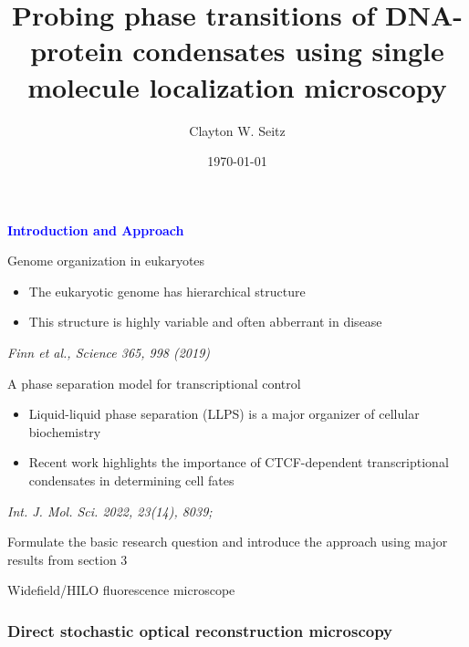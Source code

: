 \documentclass{beamer}					%
\title{Probing phase transitions of DNA-protein condensates using single molecule localization microscopy}	%
\author{Clayton W. Seitz}								%
\date{\today}									%
\begin{document}
\begin{frame}
  \titlepage
\end{frame}


%


\begin{frame}
\frametitle{}
\centering
\Large \textbf{\textcolor{blue}{Introduction and Approach}}
\end{frame}


\begin{frame}{Genome organization in eukaryotes}
\begin{itemize}
\item The eukaryotic genome has hierarchical structure
\item This structure is highly variable and often abberrant in disease
\end{itemize}

\textit{Finn et al., Science 365, 998 (2019)}
\end{frame}

\begin{frame}{A phase separation model for transcriptional control}
\begin{itemize}
\item Liquid-liquid phase separation (LLPS) is a major organizer of cellular biochemistry
\item Recent work highlights the importance of CTCF-dependent transcriptional condensates in determining cell fates
\end{itemize}

\textit{Int. J. Mol. Sci. 2022, 23(14), 8039;}
\end{frame}

\begin{frame}{}
Formulate the basic research question and introduce the approach using major results from section 3
\end{frame}

\begin{frame}{Widefield/HILO fluorescence microscope}

\end{frame}

\begin{frame}
\frametitle{Direct stochastic optical reconstruction microscopy}


  
  
\end{frame}
\end{document}
